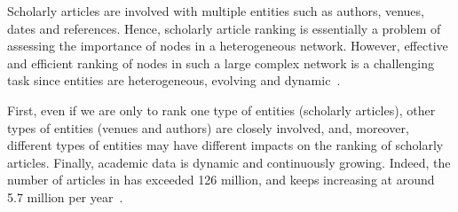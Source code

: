 



Scholarly articles are involved with multiple entities such as authors, venues, dates and references. Hence, scholarly article ranking is essentially a problem of assessing the importance of nodes in a heterogeneous network.
However, effective and efficient ranking of nodes in such a large complex network is a challenging task since entities
are heterogeneous, evolving and dynamic~\cite{AggarwalS14-survey,fcs-biggraph}.



First, even if we are only to rank one type of entities (\eg scholarly articles), other types of entities (\eg venues and authors) are closely involved, and, moreover, different types of entities may have different impacts on the ranking of scholarly articles.
%
%
%
Finally, academic data is dynamic and continuously growing. Indeed, the number of articles in \magdata has exceeded 126 million, and keeps increasing at around 5.7 million per year~\cite{Sinha15:MAG}.



